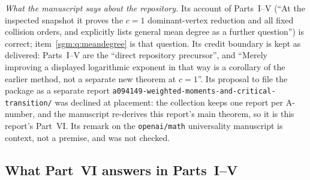 \documentclass[11pt,letterpaper]{article}
\theoremstyle{remark}\newtheorem{remark}[theorem]{Remark}
\newcommand{\file}[1]{\nolinkurl{#1}}
\theoremstyle{definition}\newtheorem{definition}[theorem]{Definition}
\begin{document}
\emph{What the manuscript says about the repository.} Its account of
Parts~I--V (``At the inspected snapshot it proves the $c=1$ dominant-vertex
reduction and all fixed collision orders, and explicitly lists general mean
degree as a further question'') is correct; item~\ref{sgm:q:meandegree} is
that question. Its credit boundary is kept as delivered: Parts~I--V are the
``direct repository precursor'', and ``Merely improving a displayed
logarithmic exponent in that way is a corollary of the earlier method, not a
separate new theorem at $c=1$''. Its proposal to file the package as a
separate report \file{a094149-weighted-moments-and-critical-transition/} was
declined at placement: the collection keeps one report per A-number, and
the manuscript re-derives this report's main theorem, so it is this report's
Part~VI. Its remark on the \texttt{openai/math} universality manuscript is
context, not a premise, and was not checked.

\subsection{What Part~VI answers in Parts~I--V}\label{sgm:md:sec:answers}
\end{document}

